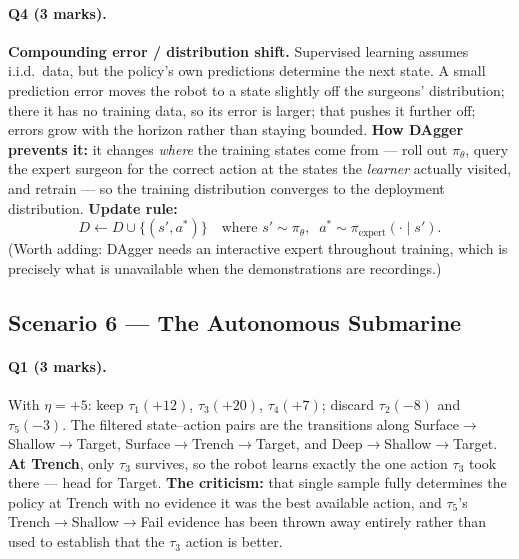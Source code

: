 \documentclass[11pt,a4paper]{article}
\begin{document}
\paragraph{Q4 (3 marks).} \textbf{Compounding error / distribution shift.}
Supervised learning assumes i.i.d.\ data, but the policy's own predictions
determine the next state. A small prediction error moves the robot to a state
slightly off the surgeons' distribution; there it has no training data, so its
error is larger; that pushes it further off; errors grow with the horizon
rather than staying bounded. \textbf{How DAgger prevents it:} it changes
\emph{where} the training states come from --- roll out $\pi_\theta$, query the
expert surgeon for the correct action at the states the \emph{learner}
actually visited, and retrain --- so the training distribution converges to the
deployment distribution. \textbf{Update rule:}
\[
D\leftarrow D\cup\{(s',a^*)\}\quad\text{where } s'\sim\pi_\theta,\;\; a^*\sim\pi_{\text{expert}}(\cdot\mid s').
\]
(Worth adding: DAgger needs an interactive expert throughout training, which
is precisely what is unavailable when the demonstrations are recordings.)

\subsection{Scenario 6 --- The Autonomous Submarine}

\paragraph{Q1 (3 marks).} With $\eta=+5$: keep $\tau_1(+12)$, $\tau_3(+20)$,
$\tau_4(+7)$; discard $\tau_2(-8)$ and $\tau_5(-3)$. The filtered
state--action pairs are the transitions along
Surface$\to$Shallow$\to$Target, Surface$\to$Trench$\to$Target, and
Deep$\to$Shallow$\to$Target. \textbf{At Trench}, only $\tau_3$ survives, so
the robot learns exactly the one action $\tau_3$ took there --- head for
Target. \textbf{The criticism:} that single sample fully determines the
policy at Trench with no evidence it was the best available action, and
$\tau_5$'s Trench$\to$Shallow$\to$Fail evidence has been thrown away entirely
rather than used to establish that the $\tau_3$ action is better.
\end{document}
